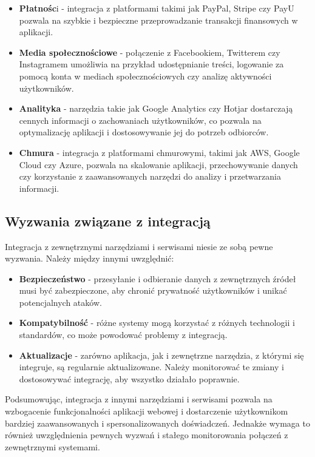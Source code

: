 \begin{itemize}
\item \textbf{Płatnośc}i - integracja z platformami takimi jak PayPal, Stripe czy PayU pozwala na szybkie i bezpieczne przeprowadzanie transakcji finansowych w aplikacji.
\item \textbf{Media społecznościowe} - połączenie z Facebookiem, Twitterem czy Instagramem umożliwia na przykład udostępnianie treści, logowanie za pomocą konta w mediach społecznościowych czy analizę aktywności użytkowników.
\item \textbf{Analityka} - narzędzia takie jak Google Analytics czy Hotjar dostarczają cennych informacji o zachowaniach użytkowników, co pozwala na optymalizację aplikacji i dostosowywanie jej do potrzeb odbiorców.
\item \textbf{Chmura} - integracja z platformami chmurowymi, takimi jak AWS, Google Cloud czy Azure, pozwala na skalowanie aplikacji, przechowywanie danych czy korzystanie z zaawansowanych narzędzi do analizy i przetwarzania informacji.
\end{itemize}

\subsection{Wyzwania związane z integracją}

Integracja z zewnętrznymi narzędziami i serwisami niesie ze sobą pewne wyzwania. Należy między innymi uwzględnić:
\begin{itemize}
\item \textbf{Bezpieczeństwo} - przesyłanie i odbieranie danych z zewnętrznych źródeł musi być zabezpieczone, aby chronić prywatność użytkowników i unikać potencjalnych ataków.
\item \textbf{Kompatybilność} - różne systemy mogą korzystać z różnych technologii i standardów, co może powodować problemy z integracją.
\item \textbf{Aktualizacje} - zarówno aplikacja, jak i zewnętrzne narzędzia, z którymi się integruje, są regularnie aktualizowane. Należy monitorować te zmiany i dostosowywać integrację, aby wszystko działało poprawnie.
\end{itemize}
Podsumowując, integracja z innymi narzędziami i serwisami pozwala na wzbogacenie funkcjonalności aplikacji webowej i dostarczenie użytkownikom bardziej zaawansowanych i spersonalizowanych doświadczeń. Jednakże wymaga to również uwzględnienia pewnych wyzwań i stałego monitorowania połączeń z zewnętrznymi systemami.

